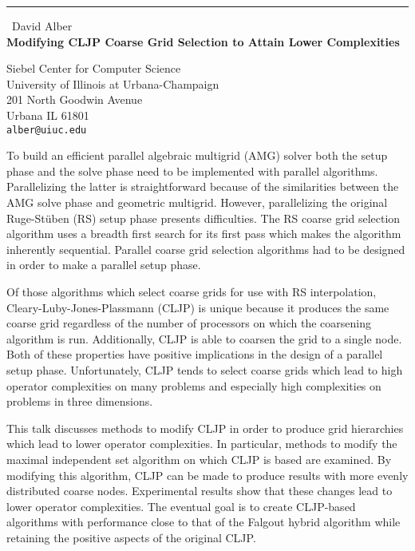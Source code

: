 \documentclass{report}
\begin{document}
\begin{center}

\rule{6in}{1pt} \
{\large David Alber \\
{\bf Modifying CLJP Coarse Grid Selection to Attain Lower
Complexities}}

Siebel Center for Computer Science \\ University of Illinois at
Urbana-Champaign \\ 201 North Goodwin Avenue \\ Urbana IL 61801
\\
{\tt alber@uiuc.edu}
\end{center}

To build an efficient parallel algebraic multigrid (AMG) solver both
the setup phase and the solve phase need to be implemented with
parallel algorithms.  Parallelizing the latter is straightforward
because of the similarities between the AMG solve phase and geometric
multigrid.  However, parallelizing the original Ruge-St\"{u}ben (RS) setup
phase presents difficulties.  The RS coarse grid selection algorithm
uses a breadth first search for its first pass which makes the
algorithm inherently sequential.  Parallel coarse grid selection
algorithms had to be designed in order to make a parallel setup phase.

Of those algorithms which select coarse grids for use with RS
interpolation, Cleary-Luby-Jones-Plassmann (CLJP) is unique because it
produces the same coarse grid regardless of the number of processors on
which the coarsening algorithm is run.  Additionally, CLJP is able to
coarsen the grid to a single node.  Both of these properties have
positive implications in the design of a parallel setup phase.
Unfortunately, CLJP tends to select coarse grids which lead to high
operator complexities on many problems and especially high complexities
on problems in three dimensions.

This talk discusses methods to modify CLJP in order to produce grid
hierarchies which lead to lower operator complexities.  In particular,
methods to modify the maximal independent set algorithm on which CLJP
is based are examined.  By modifying this algorithm, CLJP can be made
to produce results with more evenly distributed coarse nodes.
Experimental results show that these changes lead to lower operator
complexities.  The eventual goal is to create CLJP-based algorithms
with performance close to that of the Falgout hybrid algorithm while
retaining the positive aspects of the original CLJP.
\end{document}
